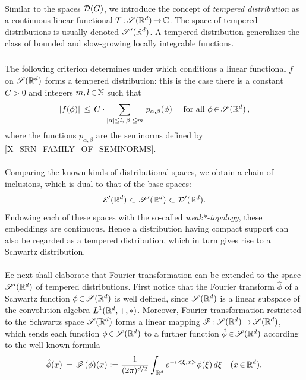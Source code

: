 \documentclass[11pt,twoside]{article}
\def\G{G}
\begin{document}
\paragraph{} %
Similar to the spaces $\D(\G)$,
we introduce the concept of \textit{tempered distribution}
as a continuous linear functional $T {\,:\,}\mathscr{S}({\mathbb{R}}^d) {\,\to\,} {\mathbb{C}}$.
The space of tempered distributions is usually denoted $\mathscr{S}'({\mathbb{R}}^d)$.
A tempered distribution generalizes the class of bounded and slow-growing
locally integrable functions.

\subparagraph{}
The following criterion determines
under which conditions a linear functional $f$ on $\mathscr{S}({\mathbb{R}}^d)$
forms a tempered distribution:
this is the case 
\iff
there is a constant $C > 0$ and integers $m,l {\,\in\,} {\mathbb{N}}$ such that
\[
\abs{ f(\phi) } \, \leq \,
C \cdot \sum_{\abs{\alpha} \leq l, \abs{\beta} \leq m} \, p_{\alpha,\beta}(\phi)
\qfa \phi \xeof \SRd\,,
\]
where the functions $p_{\alpha,\beta}$ are the seminorms
defined by \eqref{X_SRN_FAMILY_OF_SEMINORMS}.

\paragraph{} %
Comparing the known kinds of distributional spaces,
we obtain a chain of inclusions,
which is dual to that of the base spaces:
\[
{\mathcal{E}}'({\mathbb{R}}^d) \, {\,\subset\,} \, \mathscr{S}'({\mathbb{R}}^d) \, {\,\subset\,} \, {\mathcal{D}}'({\mathbb{R}}^d).
\]
Endowing each of these spaces with the so-called \textit{weak*-topology},
these embeddings are continuous.
Hence a distribution having compact support can also be regarded
as a tempered distribution,
which in turn gives rise to a Schwartz distribution.

\paragraph{} %
Ee next shall elaborate that Fourier transformation can be
extended to the space $\mathscr{S}'({\mathbb{R}}^d)$ of tempered distributions.
First notice 
that the Fourier transform $\hat{\phi}$
of a Schwartz function $\phi {\,\in\,} \mathscr{S}({\mathbb{R}}^d)$ is well defined,
since $\mathscr{S}({\mathbb{R}}^d)$ is a linear subspace of the convolution algebra $L^1({\mathbb{R}}^d,+,\ast)$.
Moreover, 
Fourier transformation restricted to the Schwartz space $\mathscr{S}({\mathbb{R}}^d)$
forms a linear mapping $\mathscr{F} {\,:\,}\mathscr{S}({\mathbb{R}}^d) {\,\to\,} \mathscr{S}({\mathbb{R}}^d)$,
which sends each function $\phi {\,\in\,} \mathscr{S}({\mathbb{R}}^d)$ to a further function
$\hat{\phi} {\,\in\,} \mathscr{S}({\mathbb{R}}^d)$ according to the well-known formula
\begin{equation}\label{FOURIER_TRANSFORM_OF_SCHWARTZ_FUNCTION}
\hat{\phi}(x) \,=\, \mathscr{F}(\phi)(x) :=
\frac{1}{(2\pi)^{d/2}}
\int_{\,{\mathbb{R}}^d} e^{-i <\xi,x>} \phi(\xi) \, d \xi
\quad (x {\,\in\,} {\mathbb{R}}^d).
\end{equation}
\end{document}
